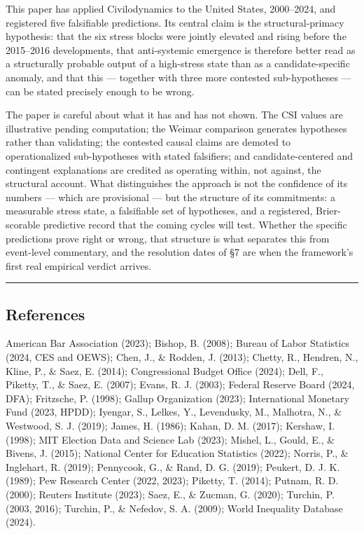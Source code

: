 \documentclass[
]{article}
\begin{document}
This paper has applied Civilodynamics to the United States, 2000--2024,
and registered five falsifiable predictions. Its central claim is the
structural-primacy hypothesis: that the six stress blocks were jointly
elevated and rising before the 2015--2016 developments, that
anti-systemic emergence is therefore better read as a structurally
probable output of a high-stress state than as a candidate-specific
anomaly, and that this --- together with three more contested
sub-hypotheses --- can be stated precisely enough to be wrong.

The paper is careful about what it has and has not shown. The CSI values
are illustrative pending computation; the Weimar comparison generates
hypotheses rather than validating; the contested causal claims are
demoted to operationalized sub-hypotheses with stated falsifiers; and
candidate-centered and contingent explanations are credited as operating
within, not against, the structural account. What distinguishes the
approach is not the confidence of its numbers --- which are provisional
--- but the structure of its commitments: a measurable stress state, a
falsifiable set of hypotheses, and a registered, Brier-scorable
predictive record that the coming cycles will test. Whether the specific
predictions prove right or wrong, that structure is what separates this
from event-level commentary, and the resolution dates of §7 are when the
framework's first real empirical verdict arrives.

\begin{center}\rule{0.5\linewidth}{0.5pt}\end{center}

\subsection{References}\label{references}

American Bar Association (2023); Bishop, B. (2008); Bureau of Labor
Statistics (2024, CES and OEWS); Chen, J., \& Rodden, J. (2013); Chetty,
R., Hendren, N., Kline, P., \& Saez, E. (2014); Congressional Budget
Office (2024); Dell, F., Piketty, T., \& Saez, E. (2007); Evans, R. J.
(2003); Federal Reserve Board (2024, DFA); Fritzsche, P. (1998); Gallup
Organization (2023); International Monetary Fund (2023, HPDD); Iyengar,
S., Lelkes, Y., Levendusky, M., Malhotra, N., \& Westwood, S. J. (2019);
James, H. (1986); Kahan, D. M. (2017); Kershaw, I. (1998); MIT Election
Data and Science Lab (2023); Mishel, L., Gould, E., \& Bivens, J.
(2015); National Center for Education Statistics (2022); Norris, P., \&
Inglehart, R. (2019); Pennycook, G., \& Rand, D. G. (2019); Peukert, D.
J. K. (1989); Pew Research Center (2022, 2023); Piketty, T. (2014);
Putnam, R. D. (2000); Reuters Institute (2023); Saez, E., \& Zucman, G.
(2020); Turchin, P. (2003, 2016); Turchin, P., \& Nefedov, S. A. (2009);
World Inequality Database (2024).
\end{document}
